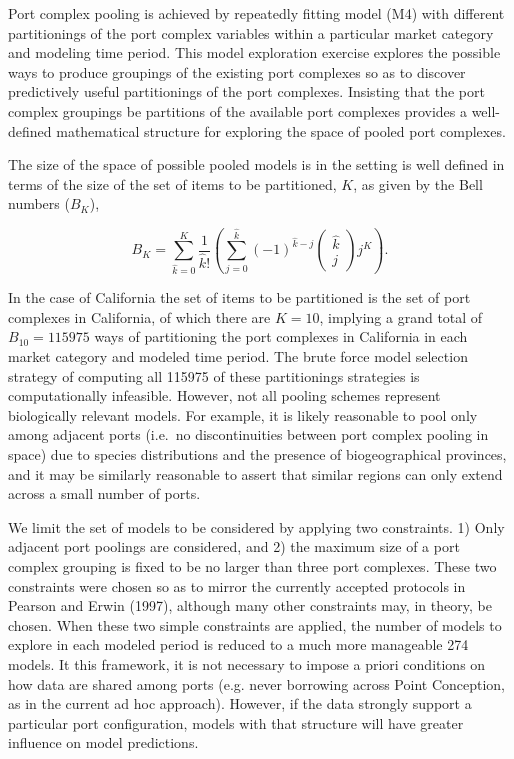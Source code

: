 \documentclass[12pt]{article}
\begin{document}
Port complex pooling is achieved by repeatedly fitting model (M4) with
different partitionings of the port complex variables within a
particular market category and modeling time period. This model
exploration exercise explores the possible ways to produce groupings of
the existing port complexes so as to discover predictively useful
partitionings of the port complexes. Insisting that the port complex
groupings be partitions of the available port complexes provides a
well-defined mathematical structure for exploring the space of pooled
port complexes.

The size of the space of possible pooled models is in the setting is
well defined in terms of the size of the set of items to be partitioned,
\(K\), as given by the Bell numbers (\(B_K\)),

\[B_K=\sum_{\hat k=0}^{K} \frac{1}{\hat k!} \left( \sum_{j=0}^{\hat k} (-1)^{\hat k -j} \left(\substack{\hat k \\ j}\right) j^K \right).\]

In the case of California the set of items to be partitioned is the set
of port complexes in California, of which there are \(K=10\), implying a
grand total of \(B_{10}=115975\) ways of partitioning the port complexes
in California in each market category and modeled time period. The brute
force model selection strategy of computing all 115975 of these
partitionings strategies is computationally infeasible. However, not all
pooling schemes represent biologically relevant models. For example, it
is likely reasonable to pool only among adjacent ports (i.e.~no
discontinuities between port complex pooling in space) due to species
distributions and the presence of biogeographical provinces, and it may
be similarly reasonable to assert that similar regions can only extend
across a small number of ports.

We limit the set of models to be considered by applying two constraints. 
1) Only adjacent port poolings are considered, and 2) the maximum size of a 
port complex grouping is fixed to be no larger than three port complexes. 
These two constraints were chosen so as to mirror the currently accepted 
protocols in Pearson and Erwin (1997), although many other constraints may, in 
theory, be chosen.
When these two simple constraints are applied, the number of models to
explore in each modeled period is reduced to a much more manageable 274
models. It this framework, it is not necessary to impose a priori conditions 
on how data are shared among ports (e.g. never borrowing across Point 
Conception, as in the current ad hoc approach). However, if the data strongly 
support a particular port configuration, models with that structure will have 
greater influence on model predictions.
\end{document}
